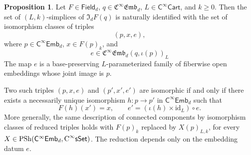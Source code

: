 \documentclass{amsart}
\newcommand{\cat}[1]{\mathsf{#1}}
\newcommand{\sset}{\cat{sSet}}
\newcommand{\id}{\mathrm{id}}
\newcommand{\CsSet}{\textnormal{C}^{\infty}\sset}
\newcommand{\fieldnoniso}[1]{\cat{Field}_{#1}}
\newcommand{\Cart}{\cat{C}^{\infty}\cat{Cart}}
\newcommand{\fembnoniso}[1]{\cat{C}^{\infty}\cat{Emb}_{#1}}
\newcommand{\femb}[1]{\mathfrak{C}^{\infty}\mathfrak{Emb}_{#1}}
\newcommand{\psh}{\mathrm{PSh}}
\theoremstyle{definition}
\newtheorem{proposition}[equation]{Proposition}
\numberwithin{equation}{subsection}
\numberwithin{subsubsection}{subsection}
\begin{document}
\begin{proposition}\label{prop:reduced.category.discrete}
  Let \(F\in \fieldnoniso{d}\), \(q\in \femb{d}\),
  \(L\in \Cart\), and \(k\geq 0\). Then the set of
  \((L,k)\)-simplices of \(\mathfrak{I}_{d}F(q)\) is naturally identified
  with the set of isomorphism classes of triples
  \[
    (p,x,e),
  \]
  where \(p\in \fembnoniso{d}\), \(x\in F(p)_k\), and
  \[
    e\in \femb{d}(q,\iota(p))_L
  \]
  The map \(e\) is a base-preserving \(L\)-parameterized family of
  fiberwise open embeddings whose joint image is \(p\).

  Two such triples \((p,x,e)\) and \((p',x',e')\) are isomorphic if and only
  if there exists a necessarily unique isomorphism \(h:p\to p'\) in
  \(\fembnoniso{d}\) such that
  \[
    F(h)(x')=x,
    \qquad
    e'=(\iota(h)\times \id_L)\circ e.
  \]
  More generally, the same description of connected components by
  isomorphism classes of reduced triples holds with \(F(p)_k\) replaced by
  \(X(p)_{L,k}\), for every
  \(X\in\psh(\fembnoniso{d},\CsSet)\). The reduction depends only on the
  embedding datum \(e\).
\end{proposition}
\end{document}
